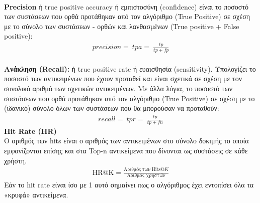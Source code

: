 \\
\noindent \textbf{Precision} ή true positive accuracy ή εμπιστοσύνη (confidence) είναι το ποσοστό των συστάσεων που ορθά προτάθηκαν από τον αλγόριθμο (True Positive) σε σχέση με το σύνολο των συστάσεων - ορθών και λανθασμένων (True positive + False positive):\\
\begin{align}
	 precision=\ tpa=\ \frac{tp}{tp+fp}
 \end{align}\\
\textbf{Ανάκληση (Recall):} ή true positive rate ή ευαισθησία (sensitivity). Υπολογίζει το ποσοστό των αντικειμένων που έχουν προταθεί και είναι σχετικά σε σχέση με τον συνολικό αριθμό των σχετικών αντικειμένων. Με άλλα λόγια, το ποσοστό των συστάσεων που ορθά προτάθηκαν από τον αλγόριθμο (True Positive) σε σχέση με το (ιδανικό) σύνολο όλων των συστάσεων που θα μπορούσαν να προταθούν:\\
\begin{align}
 recall=\ tpr=\ \frac{tp}{tp+fn} 
\end{align} 
\textbf{Hit Rate (HR)} \cite{deshpandeItemBasedTopNRecommendation2004}\\
Ο αριθμός των hits είναι ο αριθμός των αντικειμένων στο σύνολο δοκιμής το οποία εμφανίζονται επίσης και στα Top-n αντικείμενα που δίνονται ως συστάσεις σε κάθε χρήστη.
\begin{align}
\mathrm {HR@K} =\frac{\text{Αριθμός} \: \text{των} \: \text{Hits} @K}{\text{Αριθμός χρηστών}}
\end{align} 
Εάν το hit rate είναι ίσο με 1 αυτό σημαίνει πως ο αλγόριθμος έχει εντοπίσει όλα τα «κρυφά» αντικείμενα.
